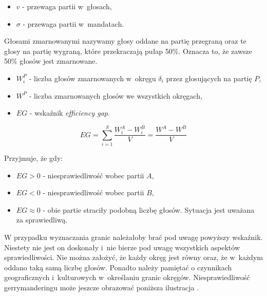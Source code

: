 \begin{itemize}
    \item $v$ - przewaga partii w~głosach,
    \item $\sigma$ - przewaga partii w~mandatach.
\end{itemize}
Głosami zmarnowanymi nazywamy głosy oddane na partię przegraną oraz te głosy na partię wygraną, które przekraczają pułap 50\%. Oznacza to, że zawsze 50\% głosów jest zmarnowane.
\begin{itemize}
    \item $W_i^P$ - liczba głosów zmarnowanych w~okręgu $\delta_i$ przez głosujących na partię $P$,
    \item $W^P$ - liczba zmarnowanych głosów we wszystkich okręgach,
    \item $EG$ - wskaźnik \textit{efficiency gap}.
\end{itemize}
\begin{equation}
    EG = \sum_{i=1}^{S}  \frac{W_i^A - W_i^B}{V} = \frac{W^A - W^B}{V}
\end{equation}

Przyjmuje, że gdy:
\begin{itemize}
    \item $EG > 0$ - niesprawiedliwość wobec partii $A$,
    \item $EG < 0$ - niesprawiedliwość wobec partii $B$,
    \item $EG \approx 0$ - obie partie straciły podobną liczbę głosów. Sytuacja jest uważana za sprawiedliwą. 
\end{itemize}

\newpage

W przypadku wyznaczania granic należałoby brać pod uwagę powyższy wskaźnik. Niestety nie jest on doskonały i~nie bierze pod uwagę wszystkich aspektów sprawiedliwości. Nie można założyć, że każdy okręg jest równy oraz, że w~każdym oddano taką samą liczbę głosów. Ponadto należy pamiętać o czynnikach geograficznych i~kulturowych w~określaniu granic okręgów. Niesprawiedliwość gerrymanderingu może jeszcze obrazować poniższa ilustracja \cite{Pierzgalski}.


